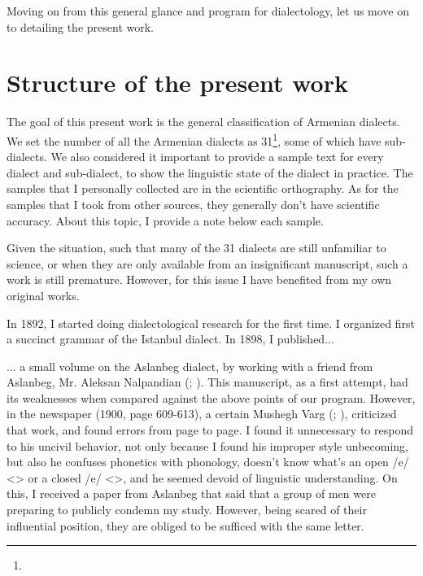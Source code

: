 Moving on from this general glance and program for dialectology, let us move on to detailing the present work. 

\section{Structure of the present work}

The goal of this present work is the general classification of Armenian dialects. We set the number of all the Armenian dialects as 31\footnote{}, some of which have sub-dialects. We also considered it important to provide a sample text for every dialect and sub-dialect, to show the linguistic state of the dialect in practice. The samples that I personally collected are in the scientific orthography. As for the samples that I took from other sources, they generally don't have scientific accuracy. About this topic, I provide a note below each sample. 

Given the situation, such that many of the 31 dialects are still unfamiliar to science, or when they are only available from an insignificant manuscript, such a work is still premature. However, for this issue I have benefited from my own original works. 

In 1892, I started doing dialectological research for the first time. I organized first a succinct grammar of the Istanbul dialect. In 1898, I published... 
\begin{adjarianpage}\label{page:13}\end{adjarianpage}%


... a small volume on the Aslanbeg dialect, by working with a friend from Aslanbeg, Mr. Aleksan Nalpandian (; ). This manuscript, as a first attempt, had its weaknesses when compared against the above points of our program. However, in the \citeauthor{Byurakn} newspaper (1900, page 609-613), a certain Mushegh Varg (; ), criticized that work, and found errors from page to page. I found it unnecessary to respond to his uncivil behavior, not only because I found his improper style unbecoming, but also he confuses phonetics with phonology, doesn't know what's an open /e/ <> or a closed /e/ <>, and he seemed devoid of linguistic understanding. On this, I received a paper from Aslanbeg that said that a group of men were preparing to publicly condemn my study. However, being scared of their influential position, they are obliged to be sufficed with the same letter. 

